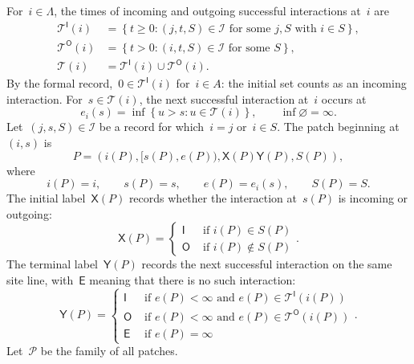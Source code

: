 \documentclass[EJP,preprint,NODS,nobera]{ejpecp}
\newcommand{\bb}[1]{\left(#1\right)}
\newcommand{\cb}[1]{\left\{#1\right\}}
\newcommand{\pw}[4]{\left\{\begin{array}{cl}
  #1 &\text{ if } #2 \\
  #3 &\text{ if } #4
\end{array}\right.}
\newcommand{\pwthree}[6]{\left\{\begin{array}{cl}
  #1 &\text{ if } #2 \\
  #3 &\text{ if } #4 \\
  #5 &\text{ if } #6
\end{array}\right.}
\begin{document}
\begin{definition}[Patch]
\label{def:patch}
For~$i\in\Lambda$, the times of incoming and outgoing successful interactions
at~$i$ are
\begin{align*}
\mathcal T^{\mathsf I}(i)
&=
\cb{t\geq0:(j,t,S)\in\mathcal I
  \text{ for some }j,S\text{ with }i\in S},
\\
\mathcal T^{\mathsf O}(i)
&=
\cb{t>0:(i,t,S)\in\mathcal I\text{ for some }S},
\\
\mathcal T(i)
&=
\mathcal T^{\mathsf I}(i)\cup\mathcal T^{\mathsf O}(i).
\end{align*}
By the formal record,~$0\in\mathcal T^{\mathsf I}(i)$ for~$i\in A$: the
initial set counts as an incoming interaction. For~$s\in\mathcal T(i)$, the
next successful interaction at~$i$ occurs at
\begin{equation*}
e_i(s)
=
\inf\cb{u>s:u\in\mathcal T(i)},
\qquad
\inf\varnothing=\infty.
\end{equation*}
Let~$(j,s,S)\in\mathcal I$ be a record for which~$i=j$ or~$i\in S$. The patch
beginning at~$(i,s)$ is
\begin{equation*}
P
=
\bb{i(P),[s(P),e(P)),\mathsf X(P)\mathsf Y(P),S(P)},
\end{equation*}
where
\begin{equation*}
i(P)=i,
\qquad
s(P)=s,
\qquad
e(P)=e_i(s),
\qquad
S(P)=S.
\end{equation*}
The initial label~$\mathsf X(P)$ records whether the interaction at~$s(P)$ is
incoming or outgoing:
\begin{equation*}
\mathsf X(P)
=
\pw{\mathsf I}{i(P)\in S(P)}{\mathsf O}{i(P)\notin S(P)}.
\end{equation*}
The terminal label~$\mathsf Y(P)$ records the next successful interaction on
the same site line, with~$\mathsf E$ meaning that there is no such interaction:
\begin{equation*}
\mathsf Y(P)
=
\pwthree
{\mathsf I}{e(P)<\infty\text{ and }e(P)\in\mathcal T^{\mathsf I}\bb{i(P)}}
{\mathsf O}{e(P)<\infty\text{ and }e(P)\in\mathcal T^{\mathsf O}\bb{i(P)}}
{\mathsf E}{e(P)=\infty}.
\end{equation*}
Let~$\mathcal P$ be the family of all patches.
\end{definition}
\end{document}
